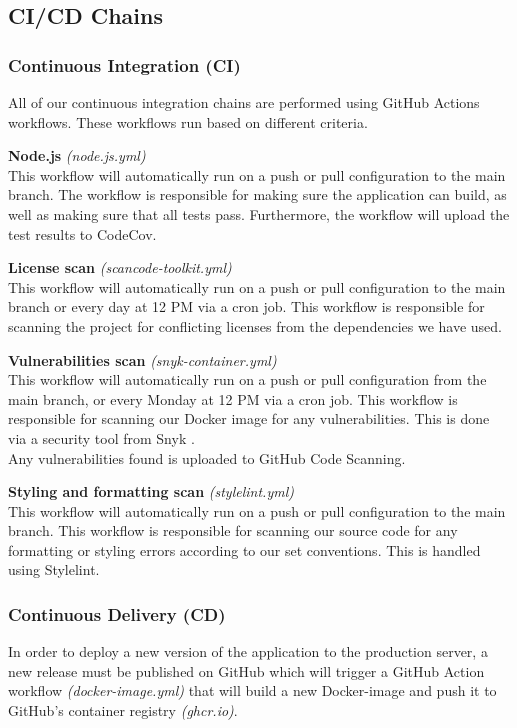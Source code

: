 \documentclass{article}
\begin{document}
\subsection{CI/CD Chains}
\subsubsection{Continuous Integration (CI)}
All of our continuous integration chains are performed using GitHub Actions workflows. These workflows run based on different criteria.

\vspace{10pt}
\noindent
\textbf{Node.js} \textit{(node.js.yml)}\\
This workflow will automatically run on a push or pull configuration to the main branch. The workflow is responsible for making sure the application can build, as well as making sure that all tests pass. Furthermore, the workflow will upload the test results to CodeCov.

\vspace{10pt}
\noindent
\textbf{License scan} \textit{(scancode-toolkit.yml)}\\
This workflow will automatically run on a push or pull configuration to the main branch or every day at 12 PM via a cron job. This workflow is responsible for scanning the project for conflicting licenses from the dependencies we have used.

\vspace{10pt}
\noindent
\textbf{Vulnerabilities scan} \textit{(snyk-container.yml)}\\
This workflow will automatically run on a push or pull configuration from the main branch, or every Monday at 12 PM via a cron job. This workflow is responsible for scanning our Docker image for any vulnerabilities. This is done via a security tool from Snyk \cite{snyk}.\\

Any vulnerabilities found is uploaded to GitHub Code Scanning.

\vspace{10pt}
\noindent
\textbf{Styling and formatting scan} \textit{(stylelint.yml)}\\
This workflow will automatically run on a push or pull configuration to the main branch. This workflow is responsible for scanning our source code for any formatting or styling errors according to our set conventions. This is handled using Stylelint.

    
\subsubsection{Continuous Delivery (CD)}
In order to deploy a new version of the application to the production server, a new release must be published on GitHub which will trigger a GitHub Action workflow \textit{(docker-image.yml)} that will build a new Docker-image and push it to GitHub's container registry \textit{(ghcr.io)}.
\end{document}
